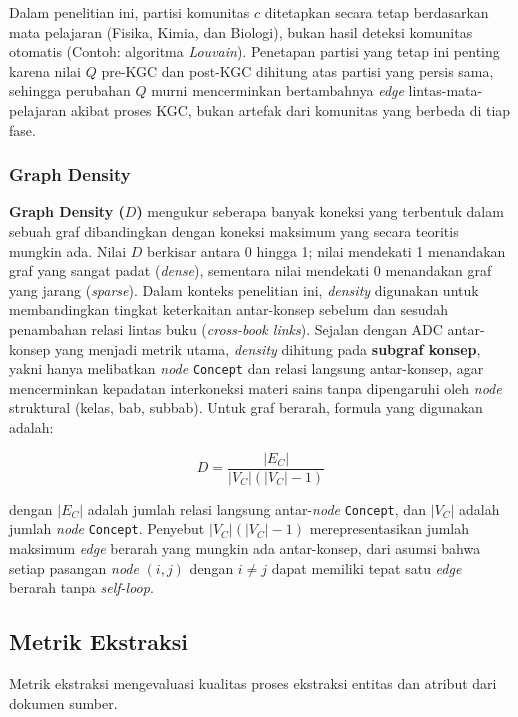 \documentclass[main]{subfiles}
\begin{document}
Dalam penelitian ini, partisi komunitas $c$ ditetapkan secara tetap
berdasarkan mata pelajaran (Fisika, Kimia, dan Biologi), bukan
hasil deteksi komunitas otomatis (Contoh: algoritma \textit{Louvain}).
Penetapan partisi yang tetap ini penting karena nilai $Q$ pre-KGC dan
post-KGC dihitung atas partisi yang persis sama, sehingga perubahan $Q$
murni mencerminkan bertambahnya \textit{edge} lintas-mata-pelajaran akibat
proses KGC, bukan artefak dari komunitas yang berbeda di tiap fase.

\subsubsection{Graph Density}

\textbf{Graph Density ($D$)} mengukur seberapa banyak koneksi yang
terbentuk dalam sebuah graf dibandingkan dengan koneksi maksimum yang
secara teoritis mungkin ada. Nilai $D$ berkisar antara 0 hingga 1; nilai
mendekati 1 menandakan graf yang sangat padat (\textit{dense}), sementara
nilai mendekati 0 menandakan graf yang jarang (\textit{sparse}). Dalam
konteks penelitian ini, \textit{density} digunakan untuk membandingkan tingkat
keterkaitan antar-konsep sebelum dan sesudah penambahan relasi lintas
buku (\textit{cross-book links}). Sejalan dengan ADC antar-konsep yang
menjadi metrik utama, \textit{density} dihitung pada \textbf{subgraf konsep},
yakni hanya melibatkan \textit{node} \texttt{Concept} dan relasi langsung
antar-konsep, agar mencerminkan kepadatan interkoneksi materi sains tanpa
dipengaruhi oleh \textit{node} struktural (kelas, bab, subbab). Untuk graf berarah,
formula yang digunakan adalah:

\[
  D = \frac{|E_C|}{|V_C|(|V_C|-1)}
\]

\noindent dengan $|E_C|$ adalah jumlah relasi langsung antar-\textit{node}
\texttt{Concept}, dan $|V_C|$ adalah jumlah \textit{node} \texttt{Concept}. Penyebut
$|V_C|(|V_C|-1)$ merepresentasikan jumlah maksimum \textit{edge} berarah
yang mungkin ada antar-konsep, dari asumsi bahwa setiap pasangan \textit{node}
$(i, j)$ dengan $i \neq j$ dapat memiliki tepat satu \textit{edge} berarah
tanpa \textit{self-loop}.

\subsection{Metrik Ekstraksi}
\label{subsec:metrik-ekstraksi}

Metrik ekstraksi mengevaluasi kualitas proses ekstraksi entitas dan
atribut dari dokumen sumber.
\end{document}

